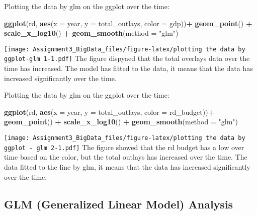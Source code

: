 \documentclass[]{article}
\newenvironment{Shaded}{\begin{snugshade}}{\end{snugshade}}
\newcommand{\KeywordTok}[1]{\textcolor[rgb]{0.13,0.29,0.53}{\textbf{#1}}}
\newcommand{\DataTypeTok}[1]{\textcolor[rgb]{0.13,0.29,0.53}{#1}}
\newcommand{\StringTok}[1]{\textcolor[rgb]{0.31,0.60,0.02}{#1}}
\newcommand{\OperatorTok}[1]{\textcolor[rgb]{0.81,0.36,0.00}{\textbf{#1}}}
\newcommand{\NormalTok}[1]{#1}
\begin{document}
Plotting the data by glm on the ggplot over the time:

\begin{Shaded}
\begin{Highlighting}[]
\KeywordTok{ggplot}\NormalTok{(rd, }\KeywordTok{aes}\NormalTok{(}\DataTypeTok{x =}\NormalTok{ year, }\DataTypeTok{y =}\NormalTok{ total_outlays, }\DataTypeTok{color =}\NormalTok{ gdp))}\OperatorTok{+}
\StringTok{  }\KeywordTok{geom_point}\NormalTok{() }\OperatorTok{+}\StringTok{ }\KeywordTok{scale_x_log10}\NormalTok{() }\OperatorTok{+}\StringTok{ }\KeywordTok{geom_smooth}\NormalTok{(}\DataTypeTok{method =} \StringTok{"glm"}\NormalTok{)}
\end{Highlighting}
\end{Shaded}

\texttt{[image: Assignment3\_BigData\_files/figure-latex/plotting the data by ggplot-glm 1-1.pdf]}
The figure dispyaed that the total overlays data over the time has
increased. The model has fitted to the data, it means that the data has
increased significantly over the time.

Plotting the data by glm on the ggplot over the time:

\begin{Shaded}
\begin{Highlighting}[]
\KeywordTok{ggplot}\NormalTok{(rd, }\KeywordTok{aes}\NormalTok{(}\DataTypeTok{x =}\NormalTok{ year, }\DataTypeTok{y =}\NormalTok{ total_outlays, }\DataTypeTok{color =}\NormalTok{ rd_budget))}\OperatorTok{+}
\StringTok{  }\KeywordTok{geom_point}\NormalTok{() }\OperatorTok{+}\StringTok{ }\KeywordTok{scale_x_log10}\NormalTok{() }\OperatorTok{+}\StringTok{ }\KeywordTok{geom_smooth}\NormalTok{(}\DataTypeTok{method =} \StringTok{"glm"}\NormalTok{)}
\end{Highlighting}
\end{Shaded}

\texttt{[image: Assignment3\_BigData\_files/figure-latex/plotting the data by ggplot - glm 2-1.pdf]}
The figure showed that the rd budget has a low over time based on the
color, but the total outlays has increased over the time. The data
fitted to the line by glm, it means that the data has increased
significantly over the time.

\subsection{GLM (Generalized Linear Model)
Analysis}\label{glm-generalized-linear-model-analysis}
\end{document}
